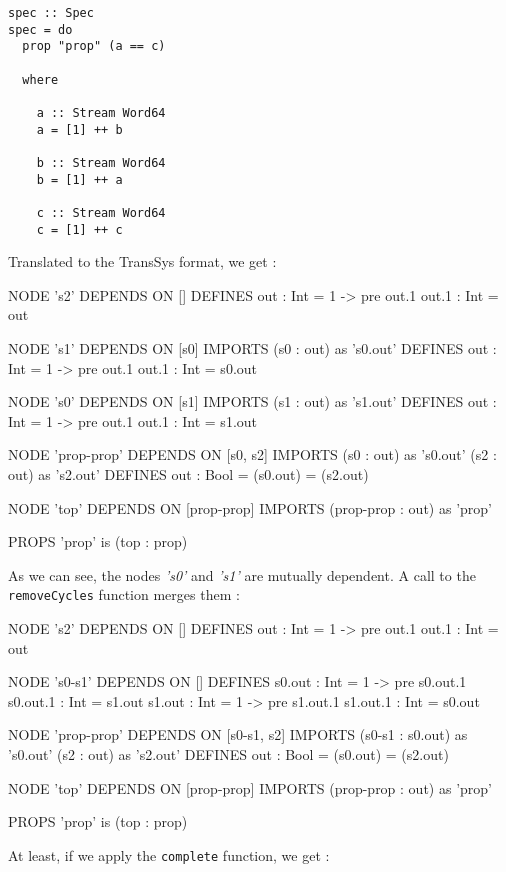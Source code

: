\begin{lstlisting}[frame=single]
spec :: Spec
spec = do
  prop "prop" (a == c)

  where

    a :: Stream Word64
    a = [1] ++ b
    
    b :: Stream Word64
    b = [1] ++ a

    c :: Stream Word64
    c = [1] ++ c
\end{lstlisting}
Translated to the TransSys format, we get :
\begin{code}
NODE 's2' DEPENDS ON []
DEFINES
    out : Int =
        1 -> pre out.1
    out.1 : Int =
        out

NODE 's1' DEPENDS ON [s0]
IMPORTS
    (s0 : out) as 's0.out'
DEFINES
    out : Int =
        1 -> pre out.1
    out.1 : Int =
        s0.out

NODE 's0' DEPENDS ON [s1]
IMPORTS
    (s1 : out) as 's1.out'
DEFINES
    out : Int =
        1 -> pre out.1
    out.1 : Int =
        s1.out

NODE 'prop-prop' DEPENDS ON [s0, s2]
IMPORTS
    (s0 : out) as 's0.out'
    (s2 : out) as 's2.out'
DEFINES
    out : Bool =
        (s0.out) = (s2.out)

NODE 'top' DEPENDS ON [prop-prop]
IMPORTS
    (prop-prop : out) as 'prop'

PROPS
'prop' is (top : prop)
\end{code}
As we can see, the nodes \textit{'s0'} and \textit{'s1'} are mutually dependent. A call to the \texttt{removeCycles} function merges them :
\begin{code}
NODE 's2' DEPENDS ON []
DEFINES
    out : Int =
        1 -> pre out.1
    out.1 : Int =
        out

NODE 's0-s1' DEPENDS ON []
DEFINES
    s0.out : Int =
        1 -> pre s0.out.1
    s0.out.1 : Int =
        s1.out
    s1.out : Int =
        1 -> pre s1.out.1
    s1.out.1 : Int =
        s0.out

NODE 'prop-prop' DEPENDS ON [s0-s1, s2]
IMPORTS
    (s0-s1 : s0.out) as 's0.out'
    (s2 : out) as 's2.out'
DEFINES
    out : Bool =
        (s0.out) = (s2.out)

NODE 'top' DEPENDS ON [prop-prop]
IMPORTS
    (prop-prop : out) as 'prop'

PROPS
'prop' is (top : prop) 
\end{code}
At least, if we apply the \texttt{complete} function, we get :
